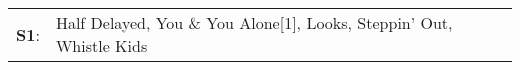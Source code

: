 \begin{supertabular}{p{0.03\textwidth}p{0.92\textwidth}}
 \textbf{S1}:  &  Half Delayed\textsuperscript{}, \enspace You \& You Alone[1]\textsuperscript{}, \enspace Looks\textsuperscript{}, \enspace Steppin' Out\textsuperscript{}, \enspace Whistle Kids\textsuperscript{}  \enspace  \\
\end{supertabular}
